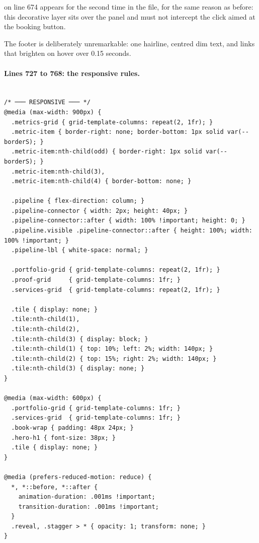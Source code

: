  on line 674 appears for the second time in the file, for
the same reason as before: this decorative layer sits over the panel and must not
intercept the click aimed at the booking button.

The footer is deliberately unremarkable: one hairline, centred dim text, and links
that brighten on hover over 0.15 seconds.

\paragraph{Lines 727 to 768: the responsive rules.}

\begin{lstlisting}[firstnumber=726,caption={\file{css/site.css}, lines 726--768}]

/* ─── RESPONSIVE ─── */
@media (max-width: 900px) {
  .metrics-grid { grid-template-columns: repeat(2, 1fr); }
  .metric-item { border-right: none; border-bottom: 1px solid var(--borderS); }
  .metric-item:nth-child(odd) { border-right: 1px solid var(--borderS); }
  .metric-item:nth-child(3),
  .metric-item:nth-child(4) { border-bottom: none; }

  .pipeline { flex-direction: column; }
  .pipeline-connector { width: 2px; height: 40px; }
  .pipeline-connector::after { width: 100% !important; height: 0; }
  .pipeline.visible .pipeline-connector::after { height: 100%; width: 100% !important; }
  .pipeline-lbl { white-space: normal; }

  .portfolio-grid { grid-template-columns: repeat(2, 1fr); }
  .proof-grid     { grid-template-columns: 1fr; }
  .services-grid  { grid-template-columns: repeat(2, 1fr); }

  .tile { display: none; }
  .tile:nth-child(1),
  .tile:nth-child(2),
  .tile:nth-child(3) { display: block; }
  .tile:nth-child(1) { top: 10%; left: 2%; width: 140px; }
  .tile:nth-child(2) { top: 15%; right: 2%; width: 140px; }
  .tile:nth-child(3) { display: none; }
}

@media (max-width: 600px) {
  .portfolio-grid { grid-template-columns: 1fr; }
  .services-grid  { grid-template-columns: 1fr; }
  .book-wrap { padding: 48px 24px; }
  .hero-h1 { font-size: 38px; }
  .tile { display: none; }
}

@media (prefers-reduced-motion: reduce) {
  *, *::before, *::after {
    animation-duration: .001ms !important;
    transition-duration: .001ms !important;
  }
  .reveal, .stagger > * { opacity: 1; transform: none; }
}
\end{lstlisting}

